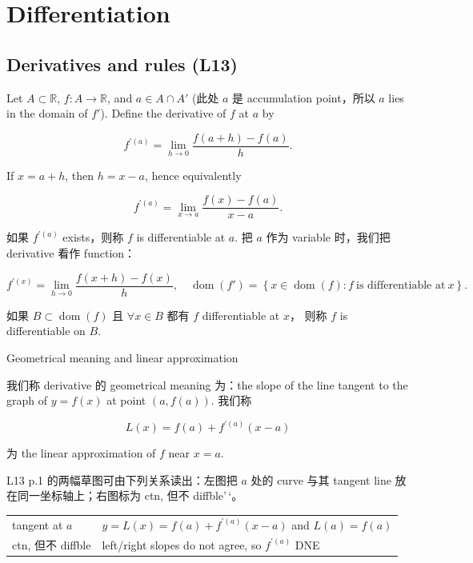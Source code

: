 \chapter{Differentiation}

\section{Derivatives and rules (L13)}

\begin{definition}{}

Let \(A \subset \mathbb{R}\), \(f:A\rightarrow\mathbb{R}\), and \(a \in A \cap A'\) (此处 \(a\) 是 accumulation point，所以 \(a\) lies in the domain of \(f'\)). Define the derivative of \(f\) at \(a\) by

\[f^{'{(a)}} = \lim\limits_{h\rightarrow 0}\frac{f\left( {a + h} \right) - f(a)}{h}.\]

If \(x = a + h\), then \(h = x - a\), hence equivalently

\[f^{'{(a)}} = \lim\limits_{x\rightarrow a}\frac{f(x) - f(a)}{x - a}.\]

如果 \(f^{'{(a)}}\) exists，则称 \(f\) is differentiable at \(a\). 把 \(a\) 作为 variable 时，我们把 derivative 看作 function：

\[f^{'{(x)}} = \lim\limits_{h\rightarrow 0}\frac{f\left( {x + h} \right) - f(x)}{h},\quad\operatorname{dom}\left( f' \right) = \left\{ {x \in \operatorname{dom}(f):f\ \text{is differentiable at}\ x} \right\}.\]

如果 \(B \subset \operatorname{dom}(f)\) 且 \(\forall x \in B\) 都有 \(f\) differentiable at \(x\)， 则称 \(f\) is differentiable on \(B\).

\end{definition}

\begin{qlremark}{Geometrical meaning and linear approximation}

我们称 derivative 的 geometrical meaning 为：the slope of the line tangent to the graph of \(y = f(x)\) at point \(\left( {a,f(a)} \right)\). 我们称

\[L(x) = f(a) + f^{'{(a)}}\left( {x - a} \right)\]

为 the linear approximation of \(f\) near \(x = a\).

L13 p.1 的两幅草图可由下列关系读出：左图把 \(a\) 处的 curve 与其 tangent line 放在同一坐标轴上；右图标为 ctn, 但不 diffble'\,`。

{\def\LTcaptype{none} %
\begin{longtable}[]{@{}ll@{}}
\toprule\noalign{}
\endhead
\bottomrule\noalign{}
\endlastfoot
tangent at \(a\) & \(y = L(x) = f(a) + f^{'{(a)}}\left( {x - a} \right)\) and \(L(a) = f(a)\) \\
ctn, 但不 diffble & left/right slopes do not agree, so \(f^{'{(a)}}\) DNE \\
\end{longtable}
}

\end{qlremark}

